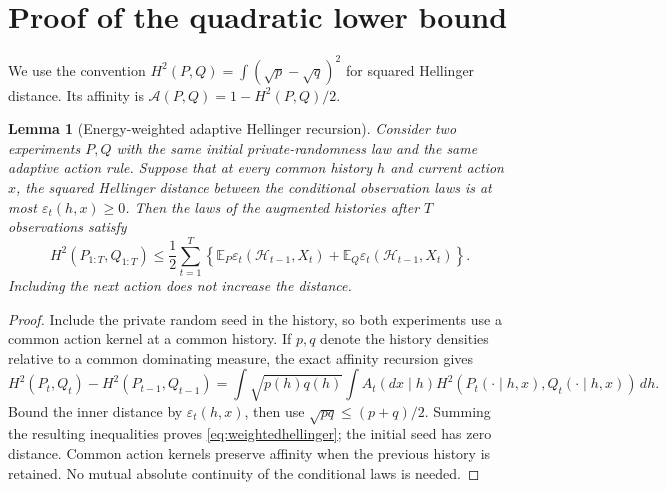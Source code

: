 \documentclass[11pt]{article}
\numberwithin{equation}{section}
\newcommand{\E}{\mathbb E}
\newtheorem{lemma}[theorem]{Lemma}
\theoremstyle{definition}
\theoremstyle{remark}
\begin{document}
\section{Proof of the quadratic lower bound}\label{app:lower}
We use the convention $H^2(P,Q)=\int(\sqrt p-\sqrt q)^2$ for squared Hellinger
distance. Its affinity is $\mathcal A(P,Q)=1-H^2(P,Q)/2$.

\begin{lemma}[Energy-weighted adaptive Hellinger recursion]\label{lem:hellinger}
Consider two experiments $P,Q$ with the same initial private-randomness law
and the same adaptive action rule. Suppose that at every common history $h$
and current action $x$, the squared Hellinger distance between the conditional
observation laws is at most $\varepsilon_t(h,x)\geq0$. Then the laws of the
augmented histories after $T$ observations satisfy
\begin{equation}\label{eq:weightedhellinger}
 H^2(P_{1:T},Q_{1:T})\leq\frac12\sum_{t=1}^T
 \left\{\E_P\varepsilon_t(\mathcal H_{t-1},X_t)
        +\E_Q\varepsilon_t(\mathcal H_{t-1},X_t)\right\}.
\end{equation}
Including the next action does not increase the distance.
\end{lemma}
\begin{proof}
Include the private random seed in the history, so both experiments use a
common action kernel at a common history. If $p,q$ denote the history
densities relative to a common dominating measure, the exact affinity
recursion gives
\[
 H^2(P_{t},Q_{t})-H^2(P_{t-1},Q_{t-1})
 =\int\sqrt{p(h)q(h)}\!\int A_t(dx\mid h)
        H^2(P_t(\cdot\mid h,x),Q_t(\cdot\mid h,x))\,dh.
\]
Bound the inner distance by $\varepsilon_t(h,x)$, then use
$\sqrt{pq}\leq(p+q)/2$. Summing the resulting inequalities proves
\eqref{eq:weightedhellinger}; the initial seed has zero distance. Common
action kernels preserve affinity when the previous history is retained.
No mutual absolute continuity of the conditional laws is needed.
\end{proof}
\end{document}
